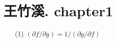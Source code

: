 \chapter{王竹溪. chapter1}

\begin{question}[p24,2]
\end{question}

\begin{enumerate}[itemindent=2em]
    \item[(1)] $(\partial f/\partial g)=1/(\partial g/\partial f)$
    
\end{enumerate}